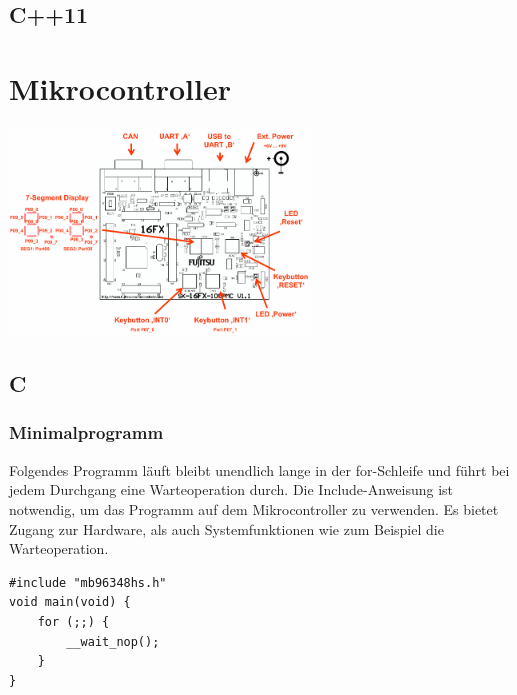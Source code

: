 \documentclass[
  accentcolor=tud1c,	%
  colorbacktitle,		%
  inverttitle,			%
  german,
  twoside
]{tudreport}
\begin{document}
\section{C++11}



\chapter{Mikrocontroller}

\begin{center}
	\includegraphics[width=0.6\textwidth]{figures/starterkit.png}
\end{center}


\section{C}
\subsection{Minimalprogramm}
Folgendes Programm läuft bleibt unendlich lange in der for-Schleife und führt bei jedem Durchgang eine Warteoperation durch.
Die Include-Anweisung ist notwendig, um das Programm auf dem Mikrocontroller zu verwenden.
Es bietet Zugang zur Hardware, als auch Systemfunktionen wie zum Beispiel die Warteoperation.
\begin{lstlisting}
#include "mb96348hs.h"
void main(void) {
	for (;;) {
		__wait_nop();
	}
}
\end{lstlisting}
\end{document}
